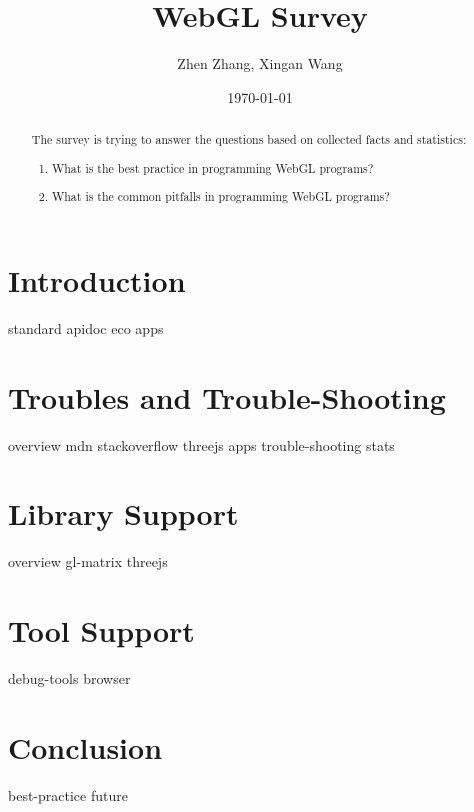 \documentclass[]{article}
\title{WebGL Survey}
\author{Zhen Zhang, Xingan Wang}
\date{\today}
\providecommand{\tightlist}{%
  \setlength{\itemsep}{0pt}\setlength{\parskip}{0pt}}
\begin{document}
\maketitle
\begin{abstract}
The survey is trying to answer the questions based on collected facts
and statistics:

\begin{enumerate}
\def\labelenumi{\arabic{enumi}.}
\tightlist
\item
  What is the best practice in programming WebGL programs?
\item
  What is the common pitfalls in programming WebGL programs?
\end{enumerate}
\end{abstract}

\tableofcontents

\newpage

\part{Introduction} {standard}
{apidoc} {eco}
{apps} \newpage
\part{Troubles and Trouble-Shooting} {overview}
{mdn} {stackoverflow}
{threejs} {apps}
{trouble-shooting} {stats} \newpage
\part{Library Support} {overview}
{gl-matrix} {threejs} \newpage
\part{Tool Support} {debug-tools}
{browser} \newpage
\part{Conclusion} {best-practice}
{future}

\newpage


\end{document}
